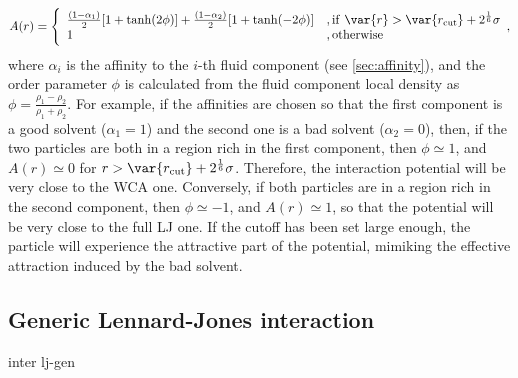 \begin{equation}
  \label{eq:lj-affinity}
  A(r) = \Biggl\{
    \begin{array}{ll}
      \frac{(1-\alpha_1)}{2} [1+\tanh(2\phi)]  +  \frac{(1-\alpha_2)}{2} [1+\tanh(-2\phi)]
      & \mathrm{, if~}  \var{r} > \var{r_\mathrm{cut}}+2^{\frac{1}{6}}\sigma\\
      1
      & \mathrm{, otherwise~} \\
    \end{array},
\end{equation}
where $\alpha_i$ is the affinity to the $i$-th fluid component (see
\ref{sec:affinity}), and the order parameter $\phi$ is calculated
from the fluid component local density as $\phi=\frac{\rho_1 -
\rho_2}{\rho_1+\rho_2}$. For example, if the affinities are chosen
so that the first component is a good solvent ($\alpha_1=1$) and
the second one is a bad solvent ($\alpha_2=0$), then, if the two
particles are both in a region rich in the first component, then
$\phi\simeq1$, and $A(r)\simeq0$ for
$r>\var{r_\mathrm{cut}}+2^{\frac{1}{6}}\sigma$.  Therefore, the
interaction potential will be very close to the WCA one. Conversely,
if both particles are in a region rich in the second component,
then $\phi\simeq-1$, and  $A(r)\simeq 1$, so that the potential
will be very close to the full LJ one. If the cutoff has been set
large enough, the particle will experience the attractive part of
the potential, mimiking the effective attraction induced by the bad
solvent.



\subsection{Generic Lennard-Jones interaction}
\label{sec:GenLennardJones}

\begin{essyntax}
  inter  
  lj-gen
  \var{\epsilon} \var{\sigma} 
    
     
  \begin{features}
  \end{features}
\end{essyntax}

